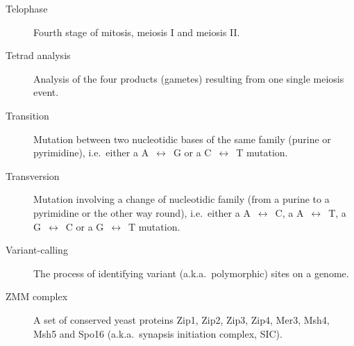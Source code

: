 \begin{alwayssingle}
\begin{description}
		\item[Telophase] Fourth stage of mitosis, meiosis I and meiosis II\@.
		\item[Tetrad analysis] Analysis of the four products (gametes) resulting from one single meiosis event.
		\item[Transition] Mutation between two nucleotidic bases of the same family (purine or pyrimidine), i.e.\ either a A~$\leftrightarrow$~G or a C~$\leftrightarrow$~T mutation.
		\item[Transversion] Mutation involving a change of nucleotidic family (from a purine to a pyrimidine or the other way round), i.e.\ either a A~$\leftrightarrow$~C, a A~$\leftrightarrow$~T, a G~$\leftrightarrow$~C or a G~$\leftrightarrow$~T mutation.
		\item[Variant-calling] The process of identifying variant (a.k.a.\ polymorphic) sites on a genome.
		\item[ZMM complex] A set of conserved yeast proteins Zip1, Zip2, Zip3, Zip4, Mer3, Msh4, Msh5 and Spo16 (a.k.a.\ synapsis initiation complex, SIC).


	\end{description}
\end{alwayssingle}
\mtcaddchapter{}


